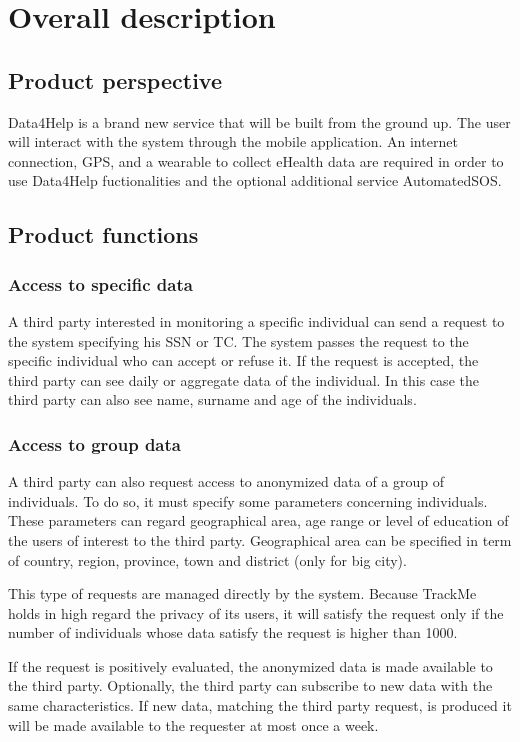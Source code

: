 \chapter{Overall description}
\section{Product perspective}
Data4Help is a brand new service that will be built from the ground up. The user will interact with the system through the mobile application. An internet connection, GPS, and a wearable to collect eHealth data are required in order to use Data4Help fuctionalities and the optional additional service AutomatedSOS.
\section{Product functions}


\subsection{Access to specific data}
A third party interested in monitoring a specific individual can send a request to the system specifying his SSN or TC.
The system passes the request to the specific individual who can accept or refuse it.
If the request is accepted, the third party can see daily or aggregate data of the individual. In this case the third party can also see name, surname and age of the individuals.


\subsection{Access to group data}
A third party can also request access to anonymized data of a group of individuals.
To do so, it must specify some parameters concerning individuals. These parameters can regard geographical area, age range or level of education of the users of interest to the third party.
Geographical area can be specified in term of country, region, province, town and district (only for big city).

This type of requests are managed directly by the system. Because TrackMe holds in high regard the privacy of its users, it will satisfy the request only if the number of individuals whose data satisfy the request is higher than 1000.

If the request is positively evaluated, the anonymized data is made available to the third party.
Optionally, the third party can subscribe to new data with the same characteristics. If new data, matching the third party request, is produced it will be made available to the requester at most once a week.




